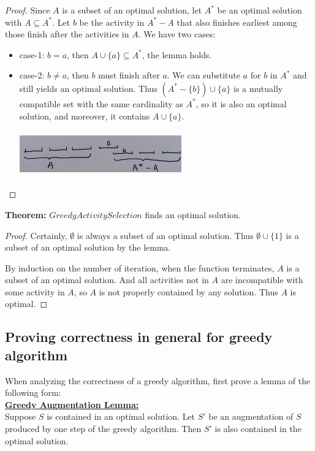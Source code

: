 \documentclass[11pt]{article}
\begin{document}
\begin{proof}
  Since $A$ is a subset of an optimal solution, let $A^*$ be an
  optimal solution with $A \subseteq A^*$. Let $b$ be the activity in
  $A^* - A$  that also finishes earliest among those finish after the
  activities in $A$. We have two cases:
\begin{itemize}
\item case-1: $b = a$, then $A \cup \{a\} \subseteq A^*$, the lemma
  holds. 
\item case-2: $b \neq a$, then $b$ must finish after $a$. We can
  substitute $a$ for $b$ in $A^*$ and still yields an optimal
  solution. Thus $(A^* - \{b\}) \cup \{a\}$ is a mutually compatible
  set with the same cardinality as $A^*$, so it is also an optimal
  solution, and moreover, it contains $A \cup \{a\}$.
  
  \includegraphics[width=7cm,height=2cm]{./imgs/activity-selection.png}
  
\end{itemize}
\end{proof}

\textbf{Theorem:} $GreedyActivitySelection$ finds an optimal
solution. 

\begin{proof}
  Certainly, $\emptyset$ is always a subset of an optimal
  solution. Thus $\emptyset \cup \{1\}$ is a subset of an optimal
  solution by the lemma. 

  By induction on the number of iteration, when the function
  terminates, $A$ is a subset of an optimal solution. And all
  activities not in $A$ are incompatible with some activity in $A$, so
  $A$ is not properly contained by any solution. Thus $A$ is optimal. 
\end{proof}

\subsection{Proving correctness in general for greedy algorithm}

When analyzing the correctness of a greedy algorithm, first prove a
lemma of the following form:\\

\underline{\textbf{Greedy Augmentation Lemma:}}\\
Suppose $S$ is contained in an optimal solution. Let $S'$ be an
augmentation of $S$ produced by one step of the greedy algorithm. Then
$S'$ is also contained in the optimal solution.\\
\end{document}
